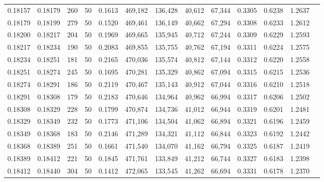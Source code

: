 \begin{tabular}{rrrrrrrrrrrrr}
0.18157 & 0.18179 &   260 &  50 &                                     0.1613 & 469,182 & 136,428 &  40,612 &  67,344 & 0.3305 & 0.6238 & 1.2637 \\
0.18179 & 0.18199 &   279 &  50 &                                     0.1520 & 469,461 & 136,149 &  40,662 &  67,294 & 0.3308 & 0.6233 & 1.2612 \\
0.18200 & 0.18217 &   204 &  50 &                                     0.1969 & 469,665 & 135,945 &  40,712 &  67,244 & 0.3309 & 0.6229 & 1.2593 \\
0.18217 & 0.18234 &   190 &  50 &                                     0.2083 & 469,855 & 135,755 &  40,762 &  67,194 & 0.3311 & 0.6224 & 1.2575 \\
0.18234 & 0.18251 &   181 &  50 &                                     0.2165 & 470,036 & 135,574 &  40,812 &  67,144 & 0.3312 & 0.6220 & 1.2558 \\
0.18251 & 0.18274 &   245 &  50 &                                     0.1695 & 470,281 & 135,329 &  40,862 &  67,094 & 0.3315 & 0.6215 & 1.2536 \\
0.18274 & 0.18291 &   186 &  50 &                                     0.2119 & 470,467 & 135,143 &  40,912 &  67,044 & 0.3316 & 0.6210 & 1.2518 \\
0.18291 & 0.18308 &   179 &  50 &                                     0.2183 & 470,646 & 134,964 &  40,962 &  66,994 & 0.3317 & 0.6206 & 1.2502 \\
0.18308 & 0.18329 &   228 &  50 &                                     0.1799 & 470,874 & 134,736 &  41,012 &  66,944 & 0.3319 & 0.6201 & 1.2481 \\
0.18329 & 0.18349 &   232 &  50 &                                     0.1773 & 471,106 & 134,504 &  41,062 &  66,894 & 0.3321 & 0.6196 & 1.2459 \\
0.18349 & 0.18368 &   183 &  50 &                                     0.2146 & 471,289 & 134,321 &  41,112 &  66,844 & 0.3323 & 0.6192 & 1.2442 \\
0.18368 & 0.18389 &   251 &  50 &                                     0.1661 & 471,540 & 134,070 &  41,162 &  66,794 & 0.3325 & 0.6187 & 1.2419 \\
0.18389 & 0.18412 &   221 &  50 &                                     0.1845 & 471,761 & 133,849 &  41,212 &  66,744 & 0.3327 & 0.6183 & 1.2398 \\
0.18412 & 0.18440 &   304 &  50 &                                     0.1412 & 472,065 & 133,545 &  41,262 &  66,694 & 0.3331 & 0.6178 & 1.2370 \\

\end{tabular}
